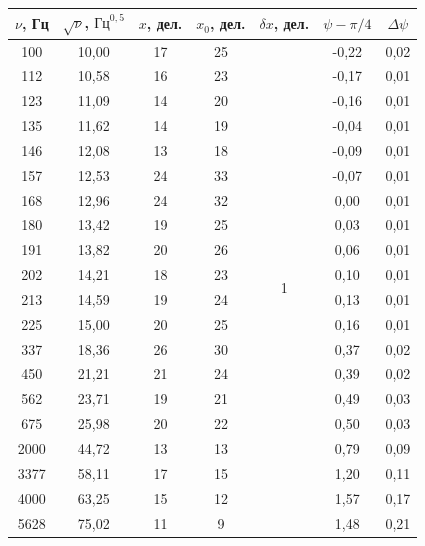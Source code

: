 \documentclass[a4paper, 12pt]{article}
\begin{document}
    \begin{table}[H]
        \centering
        \begin{tabular}{|c|c|c|c|c|c|c|}
        \hline
        $\nu$, Гц & $\sqrt{\nu}$, $\text{Гц}^{0,5}$ & $x$, дел. & $x_0$, дел. & $\delta x$, дел. & $\psi - \pi/4$ & $\Delta \psi$ \\ \hline
        100 & 10,00 & 17 & 25 & \multirow{30}{*}{1} & -0,22 & 0,02 \\ \cline{1-4} \cline{6-7} 
        112 & 10,58 & 16 & 23 &  & -0,17 & 0,01 \\ \cline{1-4} \cline{6-7} 
        123 & 11,09 & 14 & 20 &  & -0,16 & 0,01 \\ \cline{1-4} \cline{6-7} 
        135 & 11,62 & 14 & 19 &  & -0,04 & 0,01 \\ \cline{1-4} \cline{6-7} 
        146 & 12,08 & 13 & 18 &  & -0,09 & 0,01 \\ \cline{1-4} \cline{6-7} 
        157 & 12,53 & 24 & 33 &  & -0,07 & 0,01 \\ \cline{1-4} \cline{6-7} 
        168 & 12,96 & 24 & 32 &  & 0,00 & 0,01 \\ \cline{1-4} \cline{6-7} 
        180 & 13,42 & 19 & 25 &  & 0,03 & 0,01 \\ \cline{1-4} \cline{6-7} 
        191 & 13,82 & 20 & 26 &  & 0,06 & 0,01 \\ \cline{1-4} \cline{6-7} 
        202 & 14,21 & 18 & 23 &  & 0,10 & 0,01 \\ \cline{1-4} \cline{6-7} 
        213 & 14,59 & 19 & 24 &  & 0,13 & 0,01 \\ \cline{1-4} \cline{6-7} 
        225 & 15,00 & 20 & 25 &  & 0,16 & 0,01 \\ \cline{1-4} \cline{6-7} 
        337 & 18,36 & 26 & 30 &  & 0,37 & 0,02 \\ \cline{1-4} \cline{6-7} 
        450 & 21,21 & 21 & 24 &  & 0,39 & 0,02 \\ \cline{1-4} \cline{6-7} 
        562 & 23,71 & 19 & 21 &  & 0,49 & 0,03 \\ \cline{1-4} \cline{6-7} 
        675 & 25,98 & 20 & 22 &  & 0,50 & 0,03 \\ \cline{1-4} \cline{6-7} 
        2000 & 44,72 & 13 & 13 &  & 0,79 & 0,09 \\ \cline{1-4} \cline{6-7} 
        3377 & 58,11 & 17 & 15 &  & 1,20 & 0,11 \\ \cline{1-4} \cline{6-7} 
        4000 & 63,25 & 15 & 12 &  & 1,57 & 0,17 \\ \cline{1-4} \cline{6-7} 
        5628 & 75,02 & 11 & 9 &  & 1,48 & 0,21 \\ \cline{1-4} \cline{6-7} 

\end{tabular}
\end{table}
\end{document}
